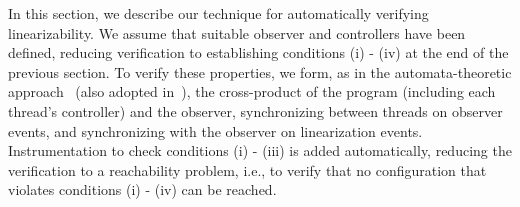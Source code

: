In this section, we describe our technique for automatically verifying
linearizability. We assume that suitable observer and controllers have
been defined, reducing verification to establishing
conditions (i) - (iv) at the end of the previous section.
To verify these properties, we
form, as in the automata-theoretic approach~\cite{VW:modelchecking}
(also adopted in~\cite{AHHR:integrated}),
the cross-product of the program (including each thread's controller) and
the observer, synchronizing between threads on observer events, and
synchronizing with the observer on linearization events.
Instrumentation to check conditions 
(i) - (iii) is added automatically, reducing the verification to a
reachability problem, i.e., to verify that no configuration that violates
conditions (i) - (iv) can be reached.

